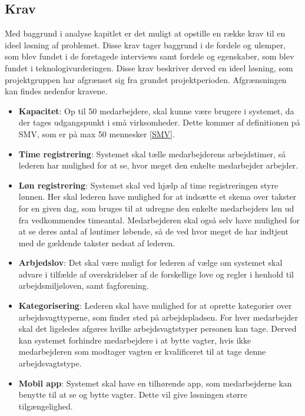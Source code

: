 \subsection{Krav}
Med baggrund i analyse kapitlet er det muligt at opstille en række krav til en ideel løsning af problemet. Disse krav tager baggrund i de fordele og ulemper, som blev fundet i de foretagede interviews samt fordele og egenskaber, som blev fundet i teknologivurderingen. Disse krav beskriver derved en ideel løsning, som projektgruppen har afgrænset sig fra grundet projektperioden. Afgrænsningen kan findes nedenfor kravene.
\begin{itemize}
    \item \textbf{Kapacitet}: Op til 50 medarbejdere, skal kunne være brugere i systemet, da der tages udgangspunkt i små virksomheder. Dette kommer af definitionen på SMV, som er på max 50 mennesker \ref{SMV}.
    \item \textbf{Time registrering}: Systemet skal tælle medarbejderens arbejdstimer, så lederen har mulighed for at se, hvor meget den enkelte medarbejder arbejder.
    \item \textbf{Løn registrering}: Systemet skal ved hjælp af time registreringen styre lønnen. Her skal lederen have mulighed for at indsætte et skema over takster for en given dag, som bruges til at udregne den enkelte medarbejders løn ud fra vedkommendes timeantal. Medarbejderen skal også selv have mulighed for at se deres antal af løntimer løbende, så de ved hvor meget de har indtjent med de gældende takster nedsat af lederen.
    \item \textbf{Arbjedslov}: Det skal være muligt for lederen af vælge om systemet skal advare i tilfælde af overskridelser af de forskellige love og regler i henhold til arbejdsmiljøloven, samt fagforening. %
    \item \textbf{Kategorisering}: Lederen skal have mulighed for at oprette kategorier over arbejdsvagttyperne, som finder sted på arbejdspladsen. For hver medarbejder skal det ligeledes afgøres hvilke arbejdsvagtstyper personen kan tage. Derved kan systemet forhindre medarbejdere i at bytte vagter, hvis ikke medarbejderen som modtager vagten er kvalificeret til at tage denne arbejdsvagtstype.
    \item \textbf{Mobil app}: Systemet skal have en tilhørende app, som medarbejderne kan benytte til at se og bytte vagter. Dette vil give løsningen større tilgængelighed.

\end{itemize}

